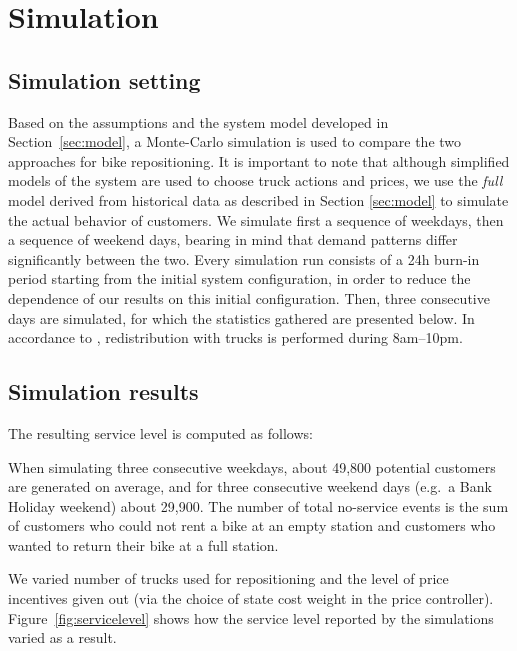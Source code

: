 \documentclass{article}
\begin{document}
\section{Simulation}
\label{sec:simulation}

\subsection{Simulation setting}
Based on the assumptions and the system model developed in
Section~\ref{sec:model}, a Monte-Carlo simulation is used to compare the two
approaches for bike repositioning. It is important to note that although
simplified models of the system are used to choose truck actions and prices, we
use the \emph{full} model derived from historical data as described in Section
\ref{sec:model} to simulate the actual behavior of customers. We simulate first
a sequence of weekdays, then a sequence of weekend days, bearing in mind that
demand patterns differ significantly between the two. Every simulation run
consists of a 24h burn-in period starting from the initial system configuration,
in order to reduce the dependence of our results on this initial configuration.
Then, three consecutive days are simulated, for which the statistics gathered
are presented below. In accordance to \cite{redistribution_2012}, redistribution
with trucks is performed during 8am--10pm.


\subsection{Simulation results}

The resulting service level is computed as follows:

When simulating three consecutive weekdays, about 49,800 potential customers are
generated on average, and for three consecutive weekend days (e.g.~a Bank
Holiday weekend) about 29,900. The number of total no-service events is the sum
of customers who could not rent a bike at an empty station and customers who
wanted to return their bike at a full station.

We varied number of trucks used for repositioning and the level of price
incentives given out (via the choice of state cost weight  in the price
controller). Figure~\ref{fig:servicelevel} shows how the service level reported
by the simulations varied as a result.
\end{document}
